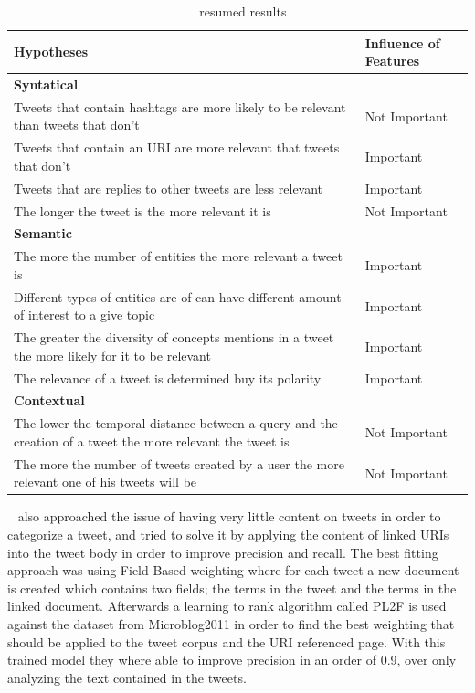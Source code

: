 \begin{table}[tb]
  \caption{~\citet{Tao2012} resumed results}
  \label{tab:tao_table}
  \begin{tabularx}{\textwidth}{|X|l|}
  \hline
  \textbf{Hypotheses} & \textbf{Influence of Features} \\
  \hline
  \hline

  {\bf Syntatical} &  \\
  \hline
  Tweets that contain hashtags are more likely to be relevant than tweets that don't & Not Important \\
  \hline
  Tweets that contain an URI are more relevant that tweets that don't  &Important \\
  \hline
  Tweets that are replies to other tweets are less relevant & Important \\
  \hline
  The longer the tweet is the more relevant it is & Not Important\\
  \hline
  \hline

  {\bf Semantic}  &  \\
  \hline
  
  The more the number of entities the more relevant a tweet is  & Important \\
  \hline
  Different types of entities are of can have different amount of interest to a give topic  & Important \\
  \hline
  The greater the diversity of concepts mentions in a tweet the more likely for it to be relevant & Important \\
  \hline
  The relevance of a tweet is determined buy its polarity & Important \\
  \hline
  \hline

  {\bf Contextual} &  \\
  \hline
  The lower the temporal distance between a query and the creation of a tweet the more relevant the tweet is  & Not Important \\
  \hline
  The more the number of tweets created by a user the more relevant one of his tweets will be & Not Important \\
  \hline
  \end{tabularx}
\end{table}

~\citet{McCreadie2013} also approached the issue of having very little content on tweets in order to categorize a tweet, and tried to solve it by applying the content of linked URIs into the tweet body in order to improve precision and recall. The best fitting approach was using Field-Based weighting where for each tweet a new document is created which contains two fields; the terms in the tweet and the terms in the linked document. 
Afterwards a learning to rank algorithm called PL2F is used against the dataset from Microblog2011 in order to find the best weighting that should be applied to the tweet corpus and the URI referenced page. 
With this trained model they where able to improve precision in an order of 0.9, over only analyzing the text contained in the tweets. 

